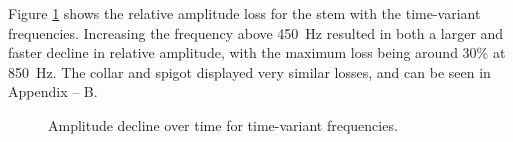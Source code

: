 Figure \ref{fig:long-term-abs-diff} shows the relative amplitude loss for the stem with the time-variant frequencies. 
Increasing the frequency above \SI{450}{Hz} resulted in both a larger and faster decline in relative amplitude, with the maximum loss being around 30\% at \SI{850}{Hz}.
The collar and spigot displayed very similar losses, and can be seen in Appendix -- B.
\begin{figure}[h] 
    \caption{Amplitude decline over time for time-variant frequencies.}
    \label{fig:long-term-abs-diff}
\end{figure}


